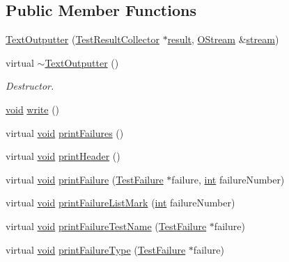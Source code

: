 \subsection*{Public Member Functions}
\begin{DoxyCompactItemize}
\item 
\hyperlink{class_text_outputter_aa513788ccc271901964847902fe3fe8e}{Text\-Outputter} (\hyperlink{class_test_result_collector}{Test\-Result\-Collector} $\ast$\hyperlink{glew_8h_a5fb5836a37f7607602a16ad733ed6357}{result}, \hyperlink{_stream_8h_a80291a4e32881b445c8d4f839a9dd979}{O\-Stream} \&\hyperlink{glew_8h_a10d3bc96cdfc1d478f52c13d5ffd9316}{stream})
\item 
virtual \hyperlink{class_text_outputter_a4198a0eaa07f3ff43fcbcab74d080b6b}{$\sim$\-Text\-Outputter} ()
\begin{DoxyCompactList}\small\item\em Destructor. \end{DoxyCompactList}\item 
\hyperlink{wglew_8h_aeea6e3dfae3acf232096f57d2d57f084}{void} \hyperlink{class_text_outputter_a6b52425e9d17a04f04fc42a88b564176}{write} ()
\item 
virtual \hyperlink{wglew_8h_aeea6e3dfae3acf232096f57d2d57f084}{void} \hyperlink{class_text_outputter_a4c1413e4ce39317c18e3eed577dd208b}{print\-Failures} ()
\item 
virtual \hyperlink{wglew_8h_aeea6e3dfae3acf232096f57d2d57f084}{void} \hyperlink{class_text_outputter_a3d80efeb41c0401372536b362358dc45}{print\-Header} ()
\item 
virtual \hyperlink{wglew_8h_aeea6e3dfae3acf232096f57d2d57f084}{void} \hyperlink{class_text_outputter_af2f2271d5795c6be4f7a47e255554a69}{print\-Failure} (\hyperlink{class_test_failure}{Test\-Failure} $\ast$failure, \hyperlink{wglew_8h_a500a82aecba06f4550f6849b8099ca21}{int} failure\-Number)
\item 
virtual \hyperlink{wglew_8h_aeea6e3dfae3acf232096f57d2d57f084}{void} \hyperlink{class_text_outputter_a029d1e203df4e3f426eb9685062683bc}{print\-Failure\-List\-Mark} (\hyperlink{wglew_8h_a500a82aecba06f4550f6849b8099ca21}{int} failure\-Number)
\item 
virtual \hyperlink{wglew_8h_aeea6e3dfae3acf232096f57d2d57f084}{void} \hyperlink{class_text_outputter_a200849dff27b10844d117029576b17ac}{print\-Failure\-Test\-Name} (\hyperlink{class_test_failure}{Test\-Failure} $\ast$failure)
\item 
virtual \hyperlink{wglew_8h_aeea6e3dfae3acf232096f57d2d57f084}{void} \hyperlink{class_text_outputter_a95c601c6a903700450d95e13db502247}{print\-Failure\-Type} (\hyperlink{class_test_failure}{Test\-Failure} $\ast$failure)

\end{DoxyCompactItemize}
